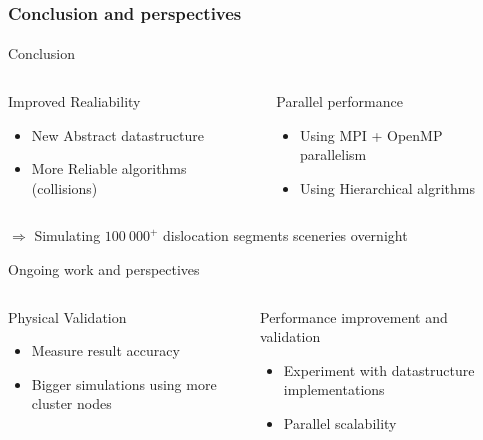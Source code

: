 \documentclass[aspectratio=1610,t,10pt]{beamer}
\begin{document}
\begin{frame}
	\frametitle{Conclusion and perspectives}
	\framesubtitle{ }
	\begin{block}{Conclusion}
		\begin{columns}[t]
			\centering
		\begin{column}{0.45\linewidth}
		Improved Realiability
		\begin{itemize}
			\item New Abstract datastructure
			\item More Reliable algorithms (collisions)
		\end{itemize}
		\end{column}
		\begin{column}{0.45\linewidth}
			Parallel performance
			\begin{itemize}
				\item Using MPI + OpenMP parallelism
				\item Using Hierarchical algrithms						
			\end{itemize}
		\end{column}
		\end{columns}
	\vspace{1em}
	\centering
	$\Rightarrow$ Simulating $100~000^+$ dislocation segments sceneries overnight
	\end{block}	

	\begin{block}{Ongoing work and perspectives}
		\begin{columns}[t]
			\centering
			\begin{column}{0.45\linewidth}
				Physical Validation
				\begin{itemize}
					\item Measure result accuracy
					\item Bigger simulations using more cluster nodes
				\end{itemize}
			\end{column}
			\begin{column}{0.45\linewidth}
				Performance improvement and validation
				\begin{itemize}
					\item Experiment with datastructure implementations
					\item Parallel scalability						
				\end{itemize}
			\end{column}
		\end{columns}
	\end{block}			
\end{frame}
\end{document}
